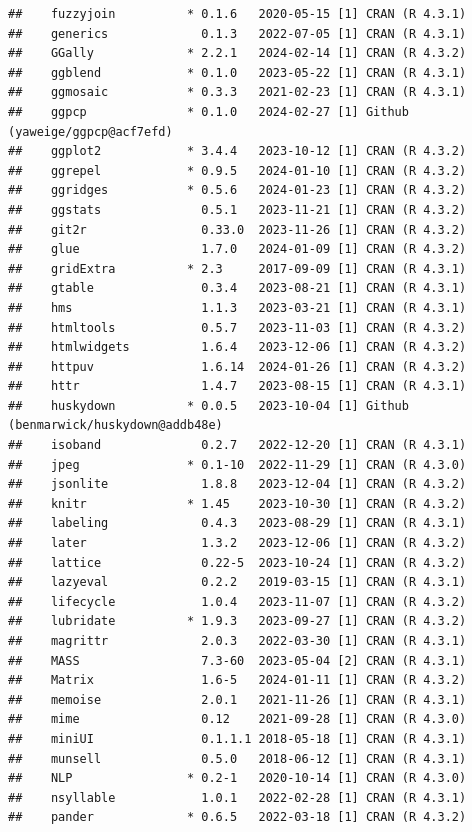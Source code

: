 \documentclass[print]{nuthesis}
\begin{document}
\begin{verbatim}
##    fuzzyjoin          * 0.1.6   2020-05-15 [1] CRAN (R 4.3.1)
##    generics             0.1.3   2022-07-05 [1] CRAN (R 4.3.1)
##    GGally             * 2.2.1   2024-02-14 [1] CRAN (R 4.3.2)
##    ggblend            * 0.1.0   2023-05-22 [1] CRAN (R 4.3.1)
##    ggmosaic           * 0.3.3   2021-02-23 [1] CRAN (R 4.3.1)
##    ggpcp              * 0.1.0   2024-02-27 [1] Github (yaweige/ggpcp@acf7efd)
##    ggplot2            * 3.4.4   2023-10-12 [1] CRAN (R 4.3.2)
##    ggrepel            * 0.9.5   2024-01-10 [1] CRAN (R 4.3.2)
##    ggridges           * 0.5.6   2024-01-23 [1] CRAN (R 4.3.2)
##    ggstats              0.5.1   2023-11-21 [1] CRAN (R 4.3.2)
##    git2r                0.33.0  2023-11-26 [1] CRAN (R 4.3.2)
##    glue                 1.7.0   2024-01-09 [1] CRAN (R 4.3.2)
##    gridExtra          * 2.3     2017-09-09 [1] CRAN (R 4.3.1)
##    gtable               0.3.4   2023-08-21 [1] CRAN (R 4.3.1)
##    hms                  1.1.3   2023-03-21 [1] CRAN (R 4.3.1)
##    htmltools            0.5.7   2023-11-03 [1] CRAN (R 4.3.2)
##    htmlwidgets          1.6.4   2023-12-06 [1] CRAN (R 4.3.2)
##    httpuv               1.6.14  2024-01-26 [1] CRAN (R 4.3.2)
##    httr                 1.4.7   2023-08-15 [1] CRAN (R 4.3.1)
##    huskydown          * 0.0.5   2023-10-04 [1] Github (benmarwick/huskydown@addb48e)
##    isoband              0.2.7   2022-12-20 [1] CRAN (R 4.3.1)
##    jpeg               * 0.1-10  2022-11-29 [1] CRAN (R 4.3.0)
##    jsonlite             1.8.8   2023-12-04 [1] CRAN (R 4.3.2)
##    knitr              * 1.45    2023-10-30 [1] CRAN (R 4.3.2)
##    labeling             0.4.3   2023-08-29 [1] CRAN (R 4.3.1)
##    later                1.3.2   2023-12-06 [1] CRAN (R 4.3.2)
##    lattice              0.22-5  2023-10-24 [1] CRAN (R 4.3.2)
##    lazyeval             0.2.2   2019-03-15 [1] CRAN (R 4.3.1)
##    lifecycle            1.0.4   2023-11-07 [1] CRAN (R 4.3.2)
##    lubridate          * 1.9.3   2023-09-27 [1] CRAN (R 4.3.2)
##    magrittr             2.0.3   2022-03-30 [1] CRAN (R 4.3.1)
##    MASS                 7.3-60  2023-05-04 [2] CRAN (R 4.3.1)
##    Matrix               1.6-5   2024-01-11 [1] CRAN (R 4.3.2)
##    memoise              2.0.1   2021-11-26 [1] CRAN (R 4.3.1)
##    mime                 0.12    2021-09-28 [1] CRAN (R 4.3.0)
##    miniUI               0.1.1.1 2018-05-18 [1] CRAN (R 4.3.1)
##    munsell              0.5.0   2018-06-12 [1] CRAN (R 4.3.1)
##    NLP                * 0.2-1   2020-10-14 [1] CRAN (R 4.3.0)
##    nsyllable            1.0.1   2022-02-28 [1] CRAN (R 4.3.1)
##    pander             * 0.6.5   2022-03-18 [1] CRAN (R 4.3.2)

\end{verbatim}
\end{document}
